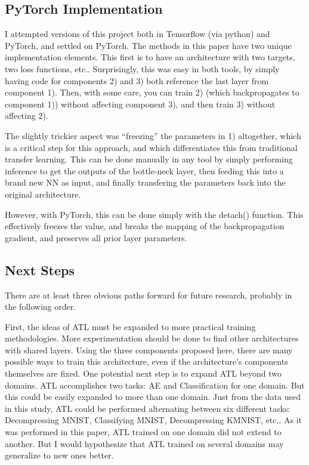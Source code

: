 \documentclass[twoside,11pt]{article}
\begin{document}
\subsection{PyTorch Implementation}

I attempted versions of this project both in Tensorflow (via python) and PyTorch, 
and settled on PyTorch.
The methods in this paper have two unique implementation elements.
This first is to have an architecture
with two targets, two loss functions, etc.. Surprisingly, this was easy in both tools, by
simply having code for components 2) and 3) both reference the last layer from component 1).
Then, with some care, you can train 2) (which backpropagates to component 1)) without 
affecting component 3), and then train 3) without affecting 2).

The slightly trickier aspect was ``freezing'' the parameters in 1) altogether, 
which is a critical step for this approach, and which differentiates this from traditional
transfer learning. This can be done manually in any tool by simply performing inference
to get the outputs of the bottle-neck layer, then feeding this into a brand new NN as input,
and finally transfering the parameters back into the original architecture.

However, with PyTorch, this can be done simply with the detach() function.
This effectively freezes the value, and breaks the mapping of the backpropagation gradient, 
and preserves all prior layer parameters.

\subsection{Next Steps}

There are at least three obvious paths forward for future research, probably in the following order.

First, the ideas of ATL must be expanded to more practical training methodologies. 
More experimentation should be done to find other architectures with shared layers.
Using the three components proposed here, there are many possible 
ways to train this architecture, even if the architecture's components themselves are fixed.
One potential next step is to expand ATL beyond two domains. ATL accomplishes two tasks:
AE and Classification for one domain. But this could be easily expanded to more than one domain. 
Just from the data used in this study, ATL could be performed alternating between six different 
tasks: Decompressing MNIST, Classifying MNIST, Decompressing KMNIST, etc..
As it was performed in this paper, ATL trained on one domain did not extend to another.
But I would hypothesize that ATL trained on several domains may generalize to new ones better.  
\end{document}
